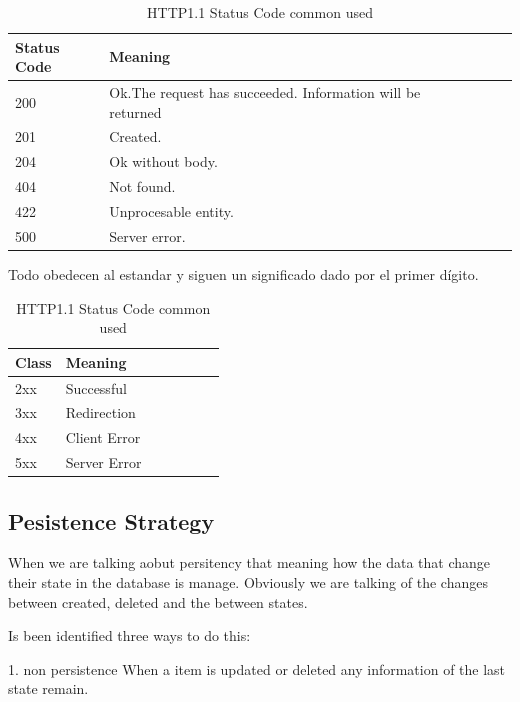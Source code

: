 \begin{table}[H]
\centering

\begin{tabular}{@{}lllllll@{}}

Status Code & Meaning\\
\midrule

200 & Ok.The request has succeeded. Information will be returned \\
201 & Created. \\
204 & Ok without body. \\
404 & Not found. \\
422 & Unprocesable entity. \\
500 & Server error. \\

\end{tabular}
\caption{HTTP1.1 Status Code common used}
\label{my-label}
\end{table}

Todo obedecen al estandar y siguen un significado dado por el primer dígito.

\begin{table}[H]
\centering

\begin{tabular}{@{}lllllll@{}}

Class & Meaning\\
\midrule

2xx & Successful\\
3xx & Redirection\\
4xx & Client Error\\
5xx & Server Error\\


\end{tabular}
\caption{HTTP1.1 Status Code common used}
\label{my-label}
\end{table}


\subsection{Pesistence Strategy}

When we are talking aobut persitency that meaning how the data that change
their state in the database is manage. Obviously we are talking of the changes
between created, deleted and the between states.

Is been identified three ways to do this:

1. non persistence
When a item is updated or deleted any information of the last state remain.

